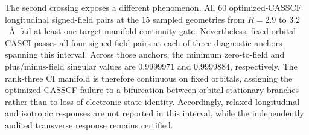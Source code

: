 The second crossing exposes a different phenomenon. All 60 optimized-CASSCF
longitudinal signed-field pairs at the 15 sampled geometries from
$R=2.9$ to $3.2$~\AA\ fail at least one target-manifold continuity gate.
Nevertheless, fixed-orbital CASCI passes all four signed-field pairs at each
of three diagnostic anchors spanning this interval. Across those anchors,
the minimum zero-to-field and plus/minus-field singular values are
$0.9999971$ and $0.9999884$, respectively. The rank-three CI manifold is
therefore continuous on fixed orbitals, assigning the optimized-CASSCF failure
to a bifurcation between orbital-stationary branches rather than to loss of
electronic-state identity. Accordingly, relaxed longitudinal and isotropic
responses are not reported in this interval, while the independently audited
transverse response remains certified.

